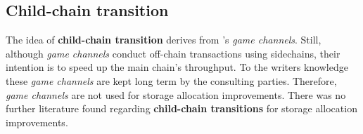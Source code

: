 \subsection{Child-chain transition}
\label{sec:CcTransition}
The idea of \textbf{child-chain transition} derives from \citet{Kraft.2016}'s \textit{game channels}.
Still, although \textit{game channels} conduct off-chain transactions using sidechains,
their intention is to speed up the main chain's throughput.
To the writers knowledge these \textit{game channels} are kept long term by the consulting parties.
Therefore, \textit{game channels} are not used for storage allocation improvements.
There was no further literature found regarding \textbf{child-chain transitions} for storage allocation improvements.
\begin{figure}[!b]
\end{figure}

